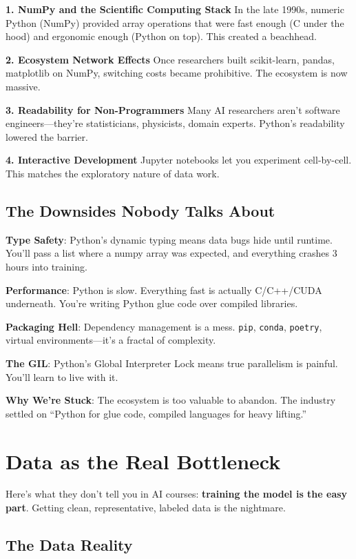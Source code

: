 \documentclass[11pt,oneside]{book}
\begin{document}
\textbf{1. NumPy and the Scientific Computing Stack}
In the late 1990s, numeric Python (NumPy) provided array operations that were fast enough (C under the hood) and ergonomic enough (Python on top). This created a beachhead.

\textbf{2. Ecosystem Network Effects}
Once researchers built scikit-learn, pandas, matplotlib on NumPy, switching costs became prohibitive. The ecosystem is now massive.

\textbf{3. Readability for Non-Programmers}
Many AI researchers aren't software engineers—they're statisticians, physicists, domain experts. Python's readability lowered the barrier.

\textbf{4. Interactive Development}
Jupyter notebooks let you experiment cell-by-cell. This matches the exploratory nature of data work.

\subsection{The Downsides Nobody Talks About}

\textbf{Type Safety}: Python's dynamic typing means data bugs hide until runtime. You'll pass a list where a numpy array was expected, and everything crashes 3 hours into training.

\textbf{Performance}: Python is slow. Everything fast is actually C/C++/CUDA underneath. You're writing Python glue code over compiled libraries.

\textbf{Packaging Hell}: Dependency management is a mess. \texttt{pip}, \texttt{conda}, \texttt{poetry}, virtual environments—it's a fractal of complexity.

\textbf{The GIL}: Python's Global Interpreter Lock means true parallelism is painful. You'll learn to live with it.

\textbf{Why We're Stuck}: The ecosystem is too valuable to abandon. The industry settled on ``Python for glue code, compiled languages for heavy lifting.''

\section{Data as the Real Bottleneck}

Here's what they don't tell you in AI courses: \textbf{training the model is the easy part}. Getting clean, representative, labeled data is the nightmare.

\subsection{The Data Reality}
\end{document}
